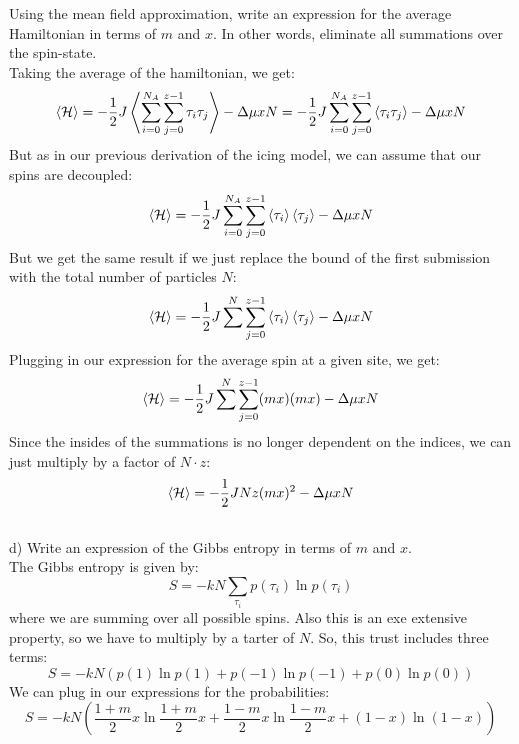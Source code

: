 \documentclass[12pt]{article}
\begin{document}
Using the mean field approximation, write an expression for the average Hamiltonian in terms of $m$ and $x$. In other words, eliminate all summations over the spin-state.\\
Taking the average of the hamiltonian, we get:
\begin{equation}
  \expval{\mathcal{H}} = -\frac{1}{2}J \expval{\sum_{i=0}^{N_{A}} \sum_{j=0}^{z-1} \tau_{i} \tau_{j}} - \Delta \mu xN = -\frac{1}{2}J \sum_{i=0}^{N_{A}} \sum_{j=0}^{z-1} \expval{\tau_{i} \tau_{j}} - \Delta \mu xN
\end{equation}
But as in our previous derivation of the icing model, we can assume that our spins are decoupled:
\begin{equation}
  \expval{\mathcal{H}} = -\frac{1}{2}J \sum_{i=0}^{N_{A}} \sum_{j=0}^{z-1} \expval{\tau_{i}} \expval{\tau_{j}} - \Delta \mu xN
\end{equation}
But we get the same result if we just replace the bound of the first submission with the total number of particles $N$:
\begin{equation}
  \expval{\mathcal{H}} = -\frac{1}{2}J \sum^{N} \sum_{j=0}^{z-1} \expval{\tau_{i}} \expval{\tau_{j}} - \Delta \mu xN
\end{equation}
Plugging in our expression for the average spin at a given site, we get:
\begin{equation}
  \expval{\mathcal{H}} = -\frac{1}{2}J \sum^{N} \sum_{j=0}^{z-1} (m x) (m x) - \Delta \mu xN
\end{equation}
Since the insides of the summations is no longer dependent on the indices, we can just multiply by a factor of $N\cdot z$:
\begin{equation}
  \expval{\mathcal{H}} = -\frac{1}{2}J N z (m x)^{2} - \Delta \mu xN
\end{equation}
\subsection{}
d) Write an expression of the Gibbs entropy in terms of $m$ and $x$.\\
The Gibbs entropy is given by:
\begin{equation}
  S=-kN \sum_{\tau_{i}} p(\tau_{i}) \ln p(\tau_{i})
\end{equation}
where we are summing over all possible spins. Also this is an exe extensive property, so we have to multiply by a tarter of $N$. So, this trust includes three terms:
\begin{equation}
  S = -kN \left( p(1) \ln p(1) + p(-1) \ln p(-1) + p(0) \ln p(0) \right) 
\end{equation}
We can plug in our expressions for the probabilities:
\begin{equation}
  S = -kN \left( \frac{1 + m}{2}x \ln \frac{1 + m}{2}x + \frac{1 - m}{2}x \ln \frac{1 - m}{2}x + (1 - x) \ln (1 - x) \right)
\end{equation}
\end{document}
